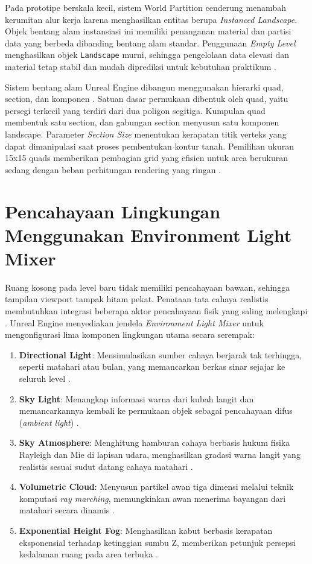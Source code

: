 \documentclass[a4paper,oneside,12pt]{report}
\begin{document}
Pada prototipe berskala kecil, sistem World Partition cenderung menambah kerumitan alur kerja karena menghasilkan entitas berupa \textit{Instanced Landscape}. Objek bentang alam instansiasi ini memiliki penanganan material dan partisi data yang berbeda dibanding bentang alam standar. Penggunaan \textit{Empty Level} menghasilkan objek \texttt{Landscape} murni, sehingga pengelolaan data elevasi dan material tetap stabil dan mudah diprediksi untuk kebutuhan praktikum \cite{modul6}.

Sistem bentang alam Unreal Engine dibangun menggunakan hierarki quad, section, dan komponen \cite{epic-landscape}. Satuan dasar permukaan dibentuk oleh quad, yaitu persegi terkecil yang terdiri dari dua poligon segitiga. Kumpulan quad membentuk satu section, dan gabungan section menyusun satu komponen landscape. Parameter \textit{Section Size} menentukan kerapatan titik verteks yang dapat dimanipulasi saat proses pembentukan kontur tanah. Pemilihan ukuran 15x15 quads memberikan pembagian grid yang efisien untuk area berukuran sedang dengan beban perhitungan rendering yang ringan \cite{epic-landscape}.

\section{Pencahayaan Lingkungan Menggunakan Environment Light Mixer}
Ruang kosong pada level baru tidak memiliki pencahayaan bawaan, sehingga tampilan viewport tampak hitam pekat. Penataan tata cahaya realistis membutuhkan integrasi beberapa aktor pencahayaan fisik yang saling melengkapi \cite{epic-lightmixer}. Unreal Engine menyediakan jendela \textit{Environment Light Mixer} untuk mengonfigurasi lima komponen lingkungan utama secara serempak:
\begin{enumerate}\setlength{\itemsep}{0.15em}\setlength{\parskip}{0pt}
	\item \textbf{Directional Light}: Mensimulasikan sumber cahaya berjarak tak terhingga, seperti matahari atau bulan, yang memancarkan berkas sinar sejajar ke seluruh level \cite{epic-lightmixer}.
	\item \textbf{Sky Light}: Menangkap informasi warna dari kubah langit dan memancarkannya kembali ke permukaan objek sebagai pencahayaan difus (\textit{ambient light}) \cite{epic-lightmixer}.
	\item \textbf{Sky Atmosphere}: Menghitung hamburan cahaya berbasis hukum fisika Rayleigh dan Mie di lapisan udara, menghasilkan gradasi warna langit yang realistis sesuai sudut datang cahaya matahari \cite{epic-lightmixer}.
	\item \textbf{Volumetric Cloud}: Menyusun partikel awan tiga dimensi melalui teknik komputasi \textit{ray marching}, memungkinkan awan menerima bayangan dari matahari secara dinamis \cite{epic-lightmixer}.
	\item \textbf{Exponential Height Fog}: Menghasilkan kabut berbasis kerapatan eksponensial terhadap ketinggian sumbu Z, memberikan petunjuk persepsi kedalaman ruang pada area terbuka \cite{epic-lightmixer}.
\end{enumerate}
\end{document}
